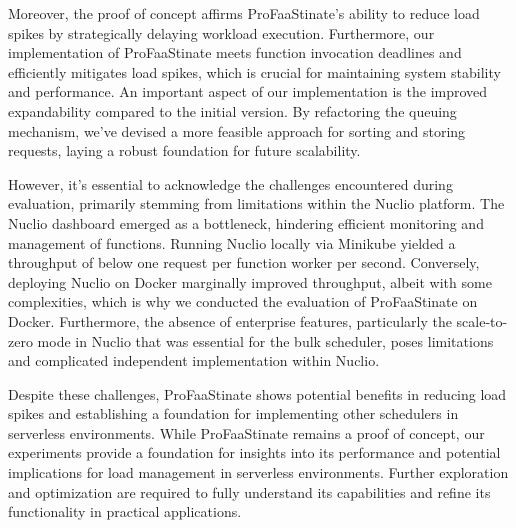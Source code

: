 Moreover, the proof of concept affirms ProFaaStinate's ability to reduce load
spikes by strategically delaying workload execution. Furthermore, our
implementation of ProFaaStinate meets function invocation deadlines and
efficiently mitigates load spikes, which is crucial for maintaining system
stability and performance. An important aspect of our implementation is the
improved expandability compared to the initial version. By refactoring the
queuing mechanism, we've devised a more feasible approach for sorting and
storing requests, laying a robust foundation for future scalability.


However, it's essential to acknowledge the challenges encountered during
evaluation, primarily stemming from limitations within the Nuclio platform. The
Nuclio dashboard emerged as a bottleneck, hindering efficient monitoring and
management of functions. Running Nuclio locally via Minikube yielded a
throughput of below one request per function worker per second. Conversely,
deploying Nuclio on Docker marginally improved throughput, albeit with some
complexities, which is why we conducted the evaluation of ProFaaStinate on
Docker. Furthermore, the absence of enterprise features, particularly the
scale-to-zero mode in Nuclio that was essential for the bulk scheduler, poses
limitations and complicated independent implementation within Nuclio.


Despite these challenges, ProFaaStinate shows potential benefits in reducing
load spikes and establishing a foundation for implementing other schedulers in
serverless environments. While ProFaaStinate remains a proof of concept, our
experiments provide a foundation for insights into its performance and potential
implications for load management in serverless environments. Further exploration
and optimization are required to fully understand its capabilities and refine
its functionality in practical applications.

